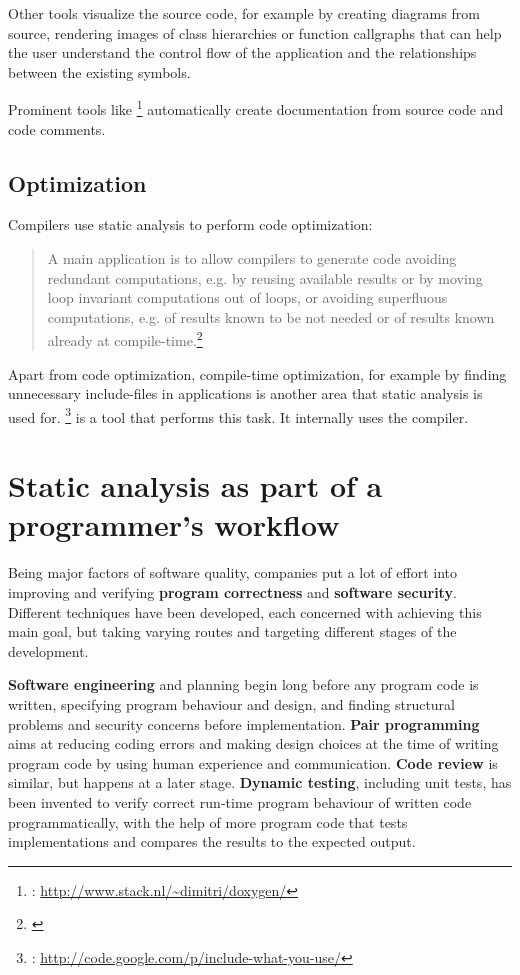 Other tools visualize the source code, for example by creating  diagrams from source, rendering images of class hierarchies or function callgraphs that can help the user understand the control flow of the application and the relationships between the existing symbols.

Prominent tools like \footnote{: \url{http://www.stack.nl/~dimitri/doxygen/}} automatically create documentation from source code and code comments.

\subsection{Optimization}

Compilers use static analysis to perform code optimization:

\begin{quotation}
A main application is to allow compilers to generate code avoiding redundant computations, e.g. by reusing available results or by moving loop invariant computations out of loops, or avoiding superfluous computations, e.g. of results known to be not needed or of results known already at compile-time.\footnote{\citep[1]{ProgramAnalysis}}
\end{quotation}

Apart from code optimization, compile-time optimization, for example by finding unnecessary include-files in  applications is another area that static analysis is used for. \footnote{: \url{http://code.google.com/p/include-what-you-use/}} is a tool that performs this task. It internally uses the  compiler.

\section{Static analysis as part of a programmer's workflow}

Being major factors of software quality, companies put a lot of effort into improving and verifying \textbf{program correctness} and \textbf{software security}. Different techniques have been developed, each concerned with achieving this main goal, but taking varying routes and targeting different stages of the development.

\textbf{Software engineering} and planning begin long before any program code is written, specifying program behaviour and design, and finding structural problems and security concerns before implementation. \textbf{Pair programming} aims at reducing coding errors and making design choices at the time of writing program code by using human experience and communication. \textbf{Code review} is similar, but happens at a later stage. \textbf{Dynamic testing}, including unit tests, has been invented to verify correct run-time program behaviour of written code programmatically, with the help of more program code that tests implementations and compares the results to the expected output.


